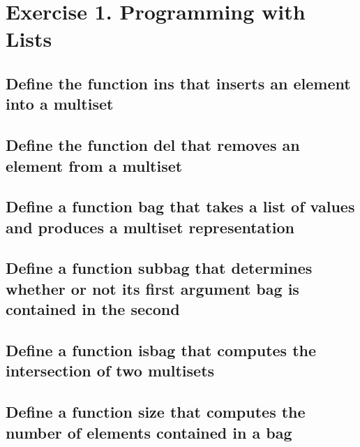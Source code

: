 \section{Exercise 1. Programming with Lists}


\subsection{Define the function ins that inserts an element into a multiset}



\subsection{Define the function del that removes an element from a multiset}



\subsection{Define a function bag that takes a list of values and produces a multiset representation}



\subsection{Define a function subbag that determines whether or not its first argument bag is contained in the second}



\subsection{Define a function isbag that computes the intersection of two multisets}



\subsection{Define a function size that computes the number of elements contained in a bag}

